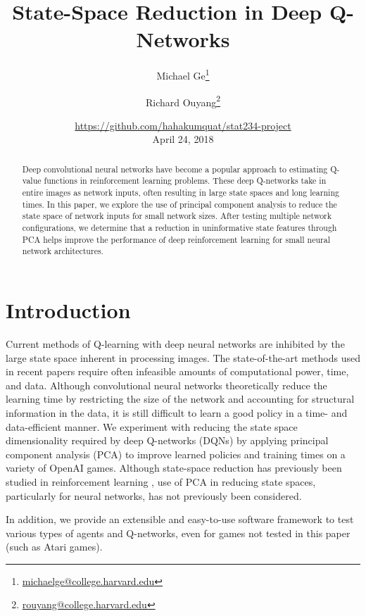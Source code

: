 \documentclass[11pt]{article}
\title{State-Space Reduction in Deep Q-Networks}
\author{Michael Ge\thanks{\url{michaelge@college.harvard.edu}} 
        \and 
        Richard Ouyang\thanks{\url{rouyang@college.harvard.edu}}}
\date{\small{\url{https://github.com/hahakumquat/stat234-project}}\\
      April 24, 2018}
\begin{document}
\maketitle

\begin{abstract}
Deep convolutional neural networks have become a popular approach to estimating Q-value functions in reinforcement learning problems. These deep Q-networks take in entire images as network inputs, often resulting in large state spaces and long learning times. In this paper, we explore the use of principal component analysis to reduce the state space of network inputs for small network sizes. After testing multiple network configurations, we determine that a reduction in uninformative state features through PCA helps improve the performance of deep reinforcement learning for small neural network architectures.
\end{abstract}

\newpage
\tableofcontents

\twocolumn
\newpage

\section{Introduction}

Current methods of Q-learning with deep neural networks are inhibited by the large state space inherent in processing images. The state-of-the-art methods used in recent papers \cite{mnih2013playing, mnih2015human, van2016deep} require often infeasible amounts of computational power, time, and data. Although convolutional neural networks theoretically reduce the learning time by restricting the size of the network and accounting for structural information in the data, it is still difficult to learn a good policy in a time- and data-efficient manner. We experiment with reducing the state space dimensionality required by deep Q-networks (DQNs) by applying principal component analysis (PCA) to improve learned policies and training times on a variety of O\-pen\-AI games. Although state-space reduction has previously been studied in reinforcement learning \cite{kishima2013reduction}, use of PCA in reducing state spaces, particularly for neural networks, has not previously been considered. 

In addition, we provide an extensible and easy-to-use software framework to test various types of agents and Q-networks, even for games not tested in this paper (such as Atari games).
\end{document}
